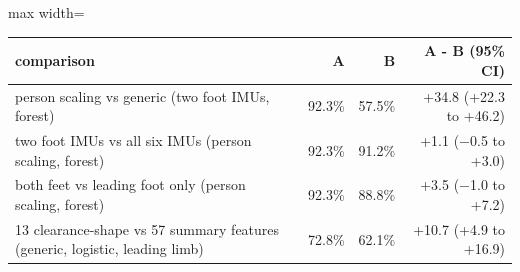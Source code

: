 \begin{adjustbox}{max width=\textwidth}
{\footnotesize
\begin{tabular}{p{7.8cm}rrr}
\toprule
\textbf{comparison} & \textbf{A} & \textbf{B} & \textbf{A - B (95\% CI)} \\
\midrule
person scaling vs generic (two foot IMUs, forest) & 92.3\% & 57.5\% & +34.8 (+22.3 to +46.2) \\
two foot IMUs vs all six IMUs (person scaling, forest) & 92.3\% & 91.2\% & +1.1 ($-$0.5 to +3.0) \\
both feet vs leading foot only (person scaling, forest) & 92.3\% & 88.8\% & +3.5 ($-$1.0 to +7.2) \\
13 clearance-shape vs 57 summary features (generic, logistic, leading limb) & 72.8\% & 62.1\% & +10.7 (+4.9 to +16.9) \\
\bottomrule
\end{tabular}
}
\end{adjustbox}
